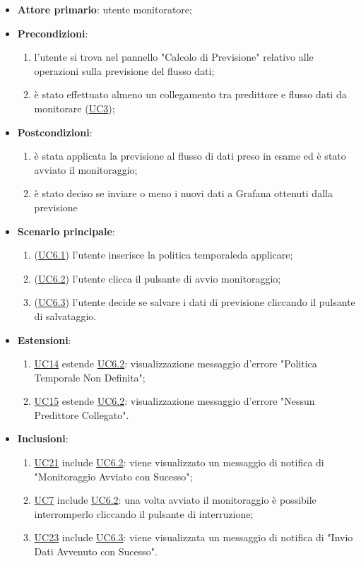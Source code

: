 		\begin{itemize}
			\item\textbf{Attore primario}: utente monitoratore;
			\item\textbf{Precondizioni}: 
				\begin{enumerate}
					\item l'utente si trova nel pannello "Calcolo di Previsione" relativo alle operazioni sulla previsione del flusso dati;
					\item è stato effettuato almeno un collegamento tra predittore e flusso dati da monitorare (\hyperref[par:UC3]{UC3});
				\end{enumerate}		
	\item\textbf{Postcondizioni}: 
				\begin{enumerate}
					\item è stata applicata la previsione al flusso di dati preso in esame ed è stato avviato il monitoraggio; 
					\item è stato deciso se inviare o meno i nuovi dati a Grafana ottenuti dalla previsione
				\end{enumerate}
			\item\textbf{Scenario principale}: 
				\begin{enumerate} 
					\item (\hyperref[par:UC6.1]{UC6.1}) l'utente inserisce la politica temporale\glo da applicare;
					\item (\hyperref[par:UC6.2]{UC6.2}) l'utente clicca il pulsante di avvio monitoraggio; 
					\item (\hyperref[par:UC6.3]{UC6.3}) l'utente decide se salvare i dati di previsione cliccando il pulsante di salvataggio.
				\end{enumerate}
			\item\textbf{Estensioni}: 
				\begin{enumerate} 
					\item \hyperref[par:UC14]{UC14} estende \hyperref[par:UC6.2]{UC6.2}: visualizzazione messaggio d’errore "Politica Temporale Non Definita";
					\item \hyperref[par:UC15]{UC15} estende \hyperref[par:UC6.2]{UC6.2}: visualizzazione messaggio d’errore "Nessun Predittore Collegato".
				\end{enumerate}
			\item\textbf{Inclusioni}: 
				\begin{enumerate} 
					\item \hyperref[par:UC21]{UC21} include \hyperref[par:UC6.2]{UC6.2}: viene visualizzato un messaggio di notifica di "Monitoraggio Avviato con Sucesso";
					\item \hyperref[par:UC7]{UC7}  include \hyperref[par:UC6.2]{UC6.2}: una volta avviato il monitoraggio è possibile interromperlo cliccando il pulsante di interruzione;
					\item \hyperref[par:UC23]{UC23} include \hyperref[par:UC6.3]{UC6.3}: viene visualizzata un messaggio di notifica di "Invio Dati Avvenuto con Sucesso".
				\end{enumerate}				
		\end{itemize}

